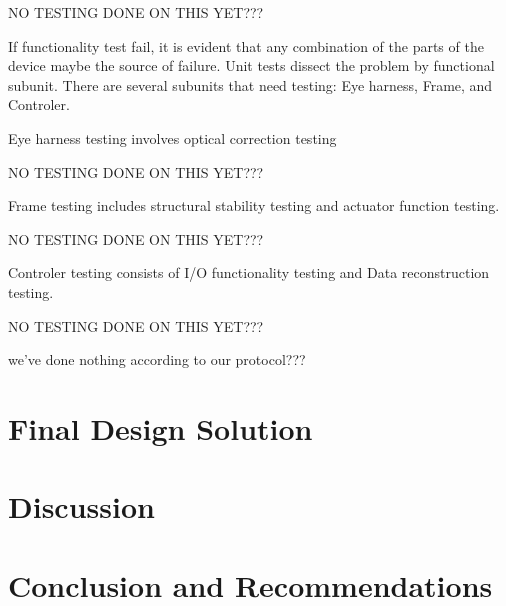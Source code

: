 \documentclass{article}
\begin{document}
NO TESTING DONE ON  THIS YET???

If functionality test fail, it is evident that any combination of the parts of the device maybe the source of 
failure. Unit tests dissect the problem by functional subunit. There are several subunits that need testing: 
Eye harness, Frame, and Controler. 

Eye harness testing involves optical correction testing

NO TESTING DONE ON  THIS YET???

Frame testing includes structural stability testing and actuator function testing.

NO TESTING DONE ON  THIS YET???

Controler testing consists of I/O functionality testing and Data reconstruction testing.

NO TESTING DONE ON  THIS YET???


we've done nothing according to our protocol???



\section{Final Design Solution}
\label{sec:final-design-solut}

\section{Discussion}
\label{sec:discussion}

\section{Conclusion and Recommendations}
\label{sec:concl-recomm}

\newpage
{}


\end{document}
